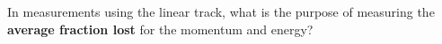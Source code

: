 \documentclass[addpoints]{physlabs}
\date{\today}
\begin{document}
\maketitle

\begin{prelab}

    

    \question[1]
    In measurements using the linear track, what is the purpose of measuring the {\bf average fraction lost} for the momentum and energy?
    \begin{solution}[3cm]
    \end{solution}

    \question

\end{prelab}
\end{document}
